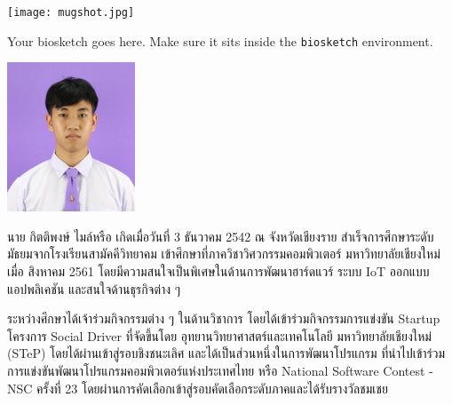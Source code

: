 \documentclass[semifinal]{cpecmu}
\author{กรวิชญ์ บัวคำปัน}{Goravit Buakampun}{610610567}
\author{กิตติพงษ์ ไมล์หรือ}{Kittipong Milerue}{610610570}
\begin{document}


\pagestyle{empty}\cleardoublepage
\normalspacing \setcounter{page}{1}  \pagestyle{cpecmu}





\ifproject

\fi



\ifproject
\appendix


\ifglossary\glossarypage\fi

\ifindex\indexpage\fi

\begin{biosketch}
\begin{center}
  \texttt{[image: mugshot.jpg]}
\end{center}
Your biosketch goes here. Make sure it sits inside
the \texttt{biosketch} environment.

\begin{center}
  \includegraphics[width=1.5in]{pic/ToonImg.jpg}  
\end{center}
นาย กิตติพงษ์ ไมล์หรือ เกิดเมื่อวันที่ 3 ธันวาคม 2542 ณ จังหวัดเชียงราย สำเร็จการศึกษาระดับมัธยมจากโรงเรียนสามัคคีวิทยาคม เข้าศึกษาที่ภาควิชาวิศวกรรมคอมพิวเตอร์ มหาวิทยาลัยเชียงใหม่ เมื่อ สิงหาคม 2561 โดยมีความสนใจเป็นพิเศษในด้านการพัฒนาฮาร์ดแวร์ ระบบ IoT ออกแบบแอปพลิเคชัน และสนใจด้านธุรกิจต่าง ๆ

ระหว่างศึกษาได้เจ้าร่วมกิจกรรมต่าง ๆ ในด้านวิชาการ  โดยได้เข้าร่วมกิจกรรมการแข่งขัน Startup โครงการ Social Driver ที่จัดขึ้นโดย อุทยานวิทยาศาสตร์และเทคโนโลยี มหาวิทยาลัยเชียงใหม่ (STeP) โดยได้ผ่านเข้าสู่รอบชิงชนะเลิศ และได้เป็นส่วนหนึ่งในการพัฒนาโปรแกรม ที่นำไปเข้าร่วมการแข่งขันพัฒนาโปรแกรมคอมพิวเตอร์แห่งประเทศไทย 
หรือ National Software Contest - NSC ครั้งที่ 23 โดยผ่านการคัดเลือกเข้าสู่รอบคัดเลือกระดับภาคและได้รับรางวัลชมเชย
\end{biosketch}
\fi %
\end{document}
